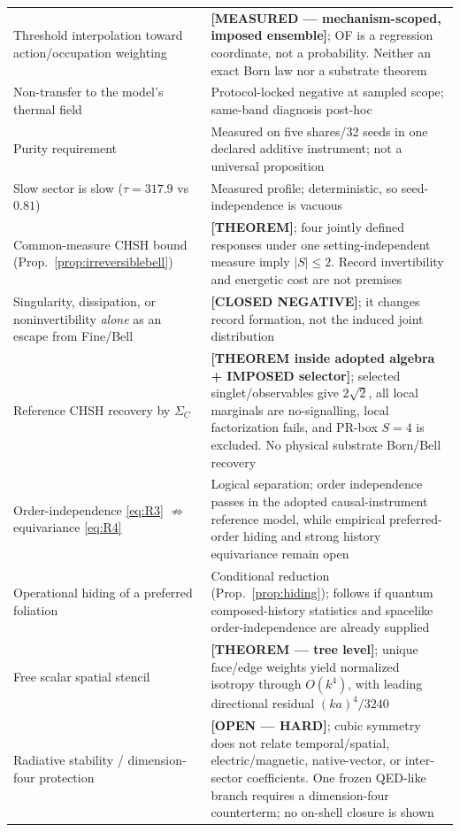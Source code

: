 \documentclass[11pt,a4paper]{article}
\theoremstyle{definition}
\theoremstyle{plain}
\theoremstyle{remark}
\begin{document}
{\begin{longtable}{p{} p{}}
Threshold interpolation toward action/occupation weighting &
\textbf{[MEASURED --- mechanism-scoped, imposed ensemble]}; OF is a
regression coordinate, not a probability. Neither an exact Born law nor a
substrate theorem \\
Non-transfer to the model's thermal field & Protocol-locked negative at
sampled scope; same-band diagnosis post-hoc \\
Purity requirement & Measured on five shares/32 seeds in one declared
additive instrument; not a universal proposition \\
Slow sector is slow ($\tau=317.9$ vs $0.81$) & Measured profile; deterministic,
so seed-independence is vacuous \\
Common-measure CHSH bound (Prop.~\ref{prop:irreversiblebell}) &
\textbf{[THEOREM]}; four jointly defined responses under one
setting-independent measure imply $|S|\le2$. Record invertibility and
energetic cost are not premises \\
Singularity, dissipation, or noninvertibility \emph{alone} as an escape
from Fine/Bell &
\textbf{[CLOSED NEGATIVE]}; it changes record formation, not the induced
joint distribution \\
Reference CHSH recovery by $\Sigma_C$ & \textbf{[THEOREM inside adopted
algebra + IMPOSED selector]}; selected singlet/observables give $2\sqrt2$,
all local marginals are no-signalling, local factorization fails, and PR-box
$S=4$ is excluded. No physical substrate Born/Bell recovery \\
Order-independence \eqref{eq:R3} $\nRightarrow$ equivariance
\eqref{eq:R4} & Logical separation; order independence passes in the adopted
causal-instrument reference model, while empirical preferred-order hiding and
strong history equivariance remain open \\
Operational hiding of a preferred foliation & Conditional reduction
(Prop.~\ref{prop:hiding}); follows if quantum composed-history statistics
and spacelike order-independence are already supplied \\
Free scalar spatial stencil & \textbf{[THEOREM --- tree level]}; unique
face/edge weights yield normalized isotropy through $O(k^4)$, with leading
directional residual $(ka)^4/3240$ \\
Radiative stability / dimension-four protection & \textbf{[OPEN ---
HARD]}; cubic symmetry does not relate temporal/spatial, electric/magnetic,
native-vector, or inter-sector coefficients. One frozen QED-like branch
requires a dimension-four counterterm; no on-shell closure is shown \\

\end{longtable}}
\end{document}
